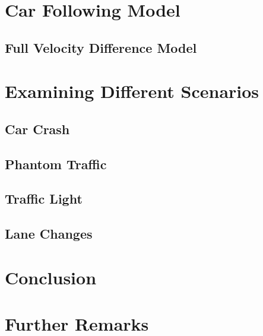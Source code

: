 \documentclass[12pt]{article}
\begin{document}
    \section{Car Following Model}
    \subsection{Full Velocity Difference Model}
    \section{Examining Different Scenarios}
    \subsection{Car Crash}
    \subsection{Phantom Traffic}
    \subsection{Traffic Light}
    \subsection{Lane Changes}
    \section{Conclusion}
    \section{Further Remarks}
    \printunsrtglossary[type=symbols,style=long,title={List of Symbols}]
    \newpage 
    \printbibliography
\end{document}
